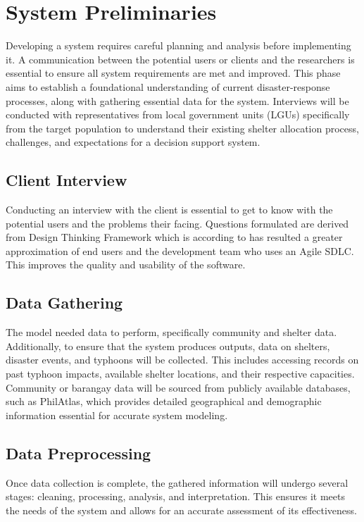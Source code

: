 \section{System Preliminaries}
	Developing a system requires careful planning and analysis before implementing it. A communication between the potential users or clients and the researchers is essential to ensure all system requirements are met and improved. This phase aims to establish a foundational understanding of current disaster-response processes, along with gathering essential data for the system. Interviews will be conducted with representatives from local government units (LGUs) specifically from the target population to understand their existing shelter allocation process, challenges, and expectations for a decision support system. 
	
\subsection{Client Interview}
	Conducting an interview with the client is essential to get to know with the potential users and the problems their facing. Questions formulated are derived from Design Thinking Framework which is according to \textcite{Julio2018} has resulted a greater approximation of end users and the development team who uses an Agile SDLC. This improves the quality and usability of the software.
	
\subsection{Data Gathering}
	The model needed data to perform, specifically community and shelter data. Additionally, to ensure that the system produces outputs, data on shelters, disaster events, and typhoons will be collected. This includes accessing records on past typhoon impacts, available shelter locations, and their respective capacities. Community or barangay data will be sourced from publicly available databases, such as PhilAtlas, which provides detailed geographical and demographic information essential for accurate system modeling.
	
\subsection{Data Preprocessing}
	Once data collection is complete, the gathered information will undergo several stages: cleaning, processing, analysis, and interpretation. This ensures it meets the needs of the system and allows for an accurate assessment of its effectiveness.
	
